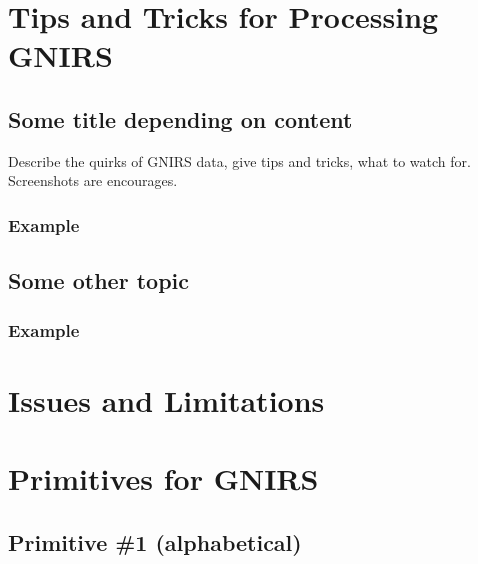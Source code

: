 \documentclass[letterpaper,10pt,english]{sphinxmanual}
\begin{document}
\section{Tips and Tricks for Processing GNIRS}
\label{GNIRS/tipstricks:gnirs-tips-tricks}\label{GNIRS/tipstricks::doc}\label{GNIRS/tipstricks:tips-and-tricks-for-processing-gnirs}

\subsection{Some title depending on content}
\label{GNIRS/tipstricks:some-title-depending-on-content}
Describe the quirks of GNIRS data, give tips
and tricks, what to watch for.  Screenshots are encourages.


\subsubsection{Example}
\label{GNIRS/tipstricks:example}

\subsection{Some other topic}
\label{GNIRS/tipstricks:some-other-topic}

\subsubsection{Example}
\label{GNIRS/tipstricks:id1}

\section{Issues and Limitations}
\label{GNIRS/issueslimitations:gnirs-issues-limitations}\label{GNIRS/issueslimitations::doc}\label{GNIRS/issueslimitations:issues-and-limitations}

\section{Primitives for GNIRS}
\label{GNIRS/primitives:gnirs-primitives}\label{GNIRS/primitives:primitives-for-gnirs}\label{GNIRS/primitives::doc}

\subsection{Primitive \#1  (alphabetical)}
\label{GNIRS/primitives_pages/primitive1:primitive-1-alphabetical}\label{GNIRS/primitives_pages/primitive1:gnirs-primitive-1}\label{GNIRS/primitives_pages/primitive1::doc}
\end{document}
